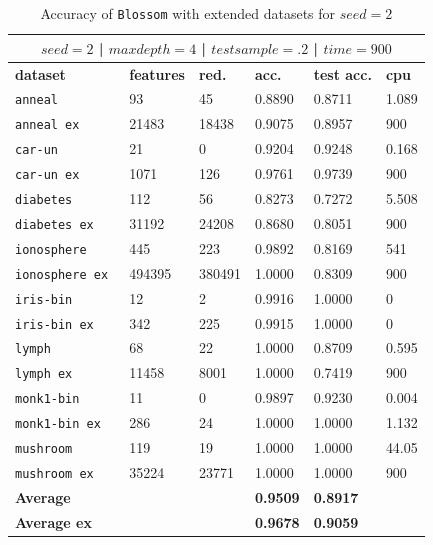 \documentclass[12pt]{report}
\theoremstyle{definition}
\theoremstyle{definition}
\theoremstyle{definition}
\begin{document}
\begin{table}[ht]
    \centering
    \begin{tabular}{L{3.5cm} R{1.8cm} R{1.8cm} R{1.8cm} R{1.8cm} R{1.8cm}}
        \hline
         \\
        \hline
        \bf dataset & \bf features & \bf red. & \bf acc. & \bf test acc. & \bf cpu \\
        \hline
        \tt anneal & 93 & 45 & 0.8890 & 0.8711 & 1.089 \\
        \tt anneal ex & 21483 & 18438 &	0.9075 & 0.8957 & 900 \\
        \tt car-un & 21 & 0 & 0.9204 & 0.9248 & 0.168 \\
        \tt car-un ex & 1071 & 126 & 0.9761 & 0.9739 & 900 \\
        \tt diabetes & 112 & 56 & 0.8273 & 0.7272 & 5.508 \\
        \tt diabetes ex & 31192 & 24208 & 0.8680 & 0.8051 & 900 \\
        \tt ionosphere & 445 & 223 & 0.9892 & 0.8169 & 541 \\
        \tt ionosphere ex & 494395 & 380491 & 1.0000 & 0.8309 & 900 \\
        \tt iris-bin & 12 & 2 & 0.9916 & 1.0000 & 0 \\
        \tt iris-bin ex & 342 & 225 & 0.9915 & 1.0000 & 0 \\
        \tt lymph & 68 & 22 & 1.0000 & 0.8709 & 0.595 \\
        \tt lymph ex & 11458 & 8001 & 1.0000 & 0.7419 & 900 \\
        \tt monk1-bin & 11 & 0 & 0.9897 & 0.9230 & 0.004 \\
        \tt monk1-bin ex & 286 & 24 & 1.0000 & 1.0000 & 1.132 \\ 
        \tt mushroom & 119 & 19 & 1.0000 & 1.0000 & 44.05 \\
        \tt mushroom ex & 35224 & 23771 & 1.0000 & 1.0000 & 900 \\
        \hline
        \bf Average & & & \bf 0.9509 & \bf 0.8917 & \\
        \hline
        \bf Average ex & & & \bf 0.9678 & \bf 0.9059 & \\
        \hline
    \end{tabular}
    \caption{Accuracy of \texttt{Blossom} with extended datasets for $seed=2$}
    \label{fig:seed2}
\end{table}
\end{document}
